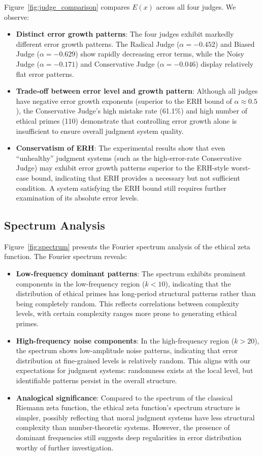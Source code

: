 \documentclass[12pt,a4paper]{article}
\theoremstyle{definition}
\theoremstyle{remark}
\begin{document}
Figure~\ref{fig:judge_comparison} compares $E(x)$ across all four judges. We observe:
\begin{itemize}
    \item \textbf{Distinct error growth patterns}: The four judges exhibit markedly different error growth patterns. The Radical Judge ($\alpha = -0.452$) and Biased Judge ($\alpha = -0.629$) show rapidly decreasing error terms, while the Noisy Judge ($\alpha = -0.171$) and Conservative Judge ($\alpha = -0.046$) display relatively flat error patterns.
    \item \textbf{Trade-off between error level and growth pattern}: Although all judges have negative error growth exponents (superior to the ERH bound of $\alpha \approx 0.5$), the Conservative Judge's high mistake rate (61.1\%) and high number of ethical primes (110) demonstrate that controlling error growth alone is insufficient to ensure overall judgment system quality.
    \item \textbf{Conservatism of ERH}: The experimental results show that even ``unhealthy'' judgment systems (such as the high-error-rate Conservative Judge) may exhibit error growth patterns superior to the ERH-style worst-case bound, indicating that ERH provides a necessary but not sufficient condition. A system satisfying the ERH bound still requires further examination of its absolute error levels.
\end{itemize}

\subsection{Spectrum Analysis}

Figure~\ref{fig:spectrum} presents the Fourier spectrum analysis of the ethical zeta function. The Fourier spectrum reveals:
\begin{itemize}
    \item \textbf{Low-frequency dominant patterns}: The spectrum exhibits prominent components in the low-frequency region ($k < 10$), indicating that the distribution of ethical primes has long-period structural patterns rather than being completely random. This reflects correlations between complexity levels, with certain complexity ranges more prone to generating ethical primes.
    \item \textbf{High-frequency noise components}: In the high-frequency region ($k > 20$), the spectrum shows low-amplitude noise patterns, indicating that error distribution at fine-grained levels is relatively random. This aligns with our expectations for judgment systems: randomness exists at the local level, but identifiable patterns persist in the overall structure.
    \item \textbf{Analogical significance}: Compared to the spectrum of the classical Riemann zeta function, the ethical zeta function's spectrum structure is simpler, possibly reflecting that moral judgment systems have less structural complexity than number-theoretic systems. However, the presence of dominant frequencies still suggests deep regularities in error distribution worthy of further investigation.
\end{itemize}
\end{document}
